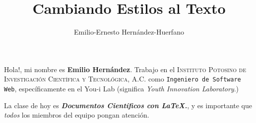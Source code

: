 \documentclass[12pt,letterpaper,oneside]{book}
\title{Cambiando Estilos al Texto}
\author{Emilio-Ernesto Hernández-Huerfano}
\begin{document}
\maketitle

Hola!, mi nombre es \textbf{Emilio Hernández}. Trabajo en el \textsc{Instituto Potosino de Investigación Científica y Tecnológica, A.C.} como \texttt{Ingeniero de Software Web}, específicamente en el \textsf{You-i Lab} (significa \textit{Youth Innovation Laboratory}.)

La clase de hoy es \textbf{\textit{Documentos Científicos con \LaTeX.}}, y es importante que \emph{todos} los miembros del equipo pongan atención.
\end{document}
